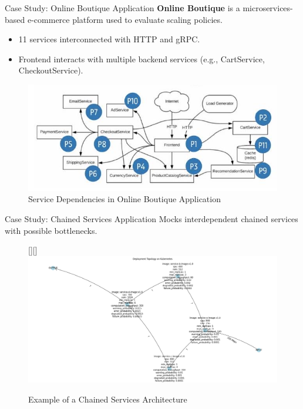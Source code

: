 \documentclass{beamer}
\begin{document}
\begin{frame}{Case Study: Online Boutique Application}
    \textbf{Online Boutique} is a microservices-based e-commerce platform used to evaluate scaling policies.
    \begin{itemize}
        \item 11 services interconnected with HTTP and gRPC.
        \item Frontend interacts with multiple backend services (e.g., CartService, CheckoutService).
    \end{itemize}
    \begin{figure}
        \includegraphics[width=\textwidth]{images/2024_11_17_21ad14b6196e5740bf69g-6.jpg} %
        \caption*{Service Dependencies in Online Boutique Application}
    \end{figure}
\end{frame}

\begin{frame}{Case Study: Chained Services Application}
    Mocks interdependent chained services with possible bottlenecks.
    \hspace{-2cm}
    \begin{figure}
        \vspace{-0.5cm}

        \raisebox{0pt}[\height][\depth]{\hspace{-2cm}\includegraphics[width=1.3\textwidth]{images/cs_topology.png}}

        \caption*{Example of a Chained Services Architecture}
    \end{figure}
\end{frame}
\end{document}
